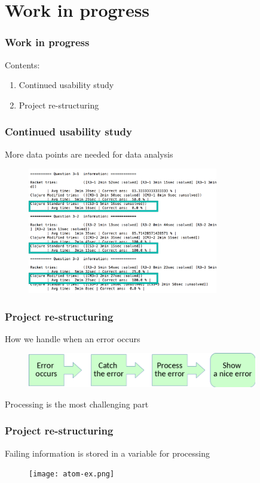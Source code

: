 \documentclass{beamer}
\begin{document}
\section{Work in progress}

\begin{frame}
  \frametitle{Work in progress}
Contents:
\begin{enumerate}
\item Continued usability study 
\item Project re-structuring
\end{enumerate}
\end{frame}

\begin{frame}
  \frametitle{Continued usability study }
More data points are needed for data analysis
\begin{figure}
\includegraphics[height=55mm]{one-data.png}
\end{figure}
\end{frame}


\begin{frame}
  \frametitle{Project re-structuring}
How we handle when an error occurs 
\begin{figure}
\includegraphics[height=15mm]{Step.png}
\end{figure}
\alert{Processing} is the most challenging part
\end{frame}


\begin{frame}
  \frametitle{Project re-structuring}
Failing information is stored in a variable for processing
\begin{figure}
\texttt{[image: atom-ex.png]}
\end{figure}
\end{frame}
\end{document}
